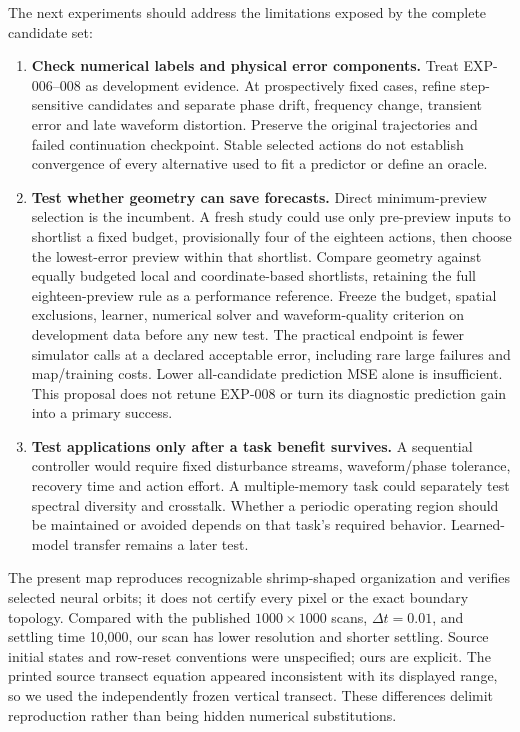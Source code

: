 \documentclass[11pt,letterpaper]{article}
\begin{document}
The next experiments should address the limitations exposed by the complete candidate set:
\begin{enumerate}
\item \textbf{Check numerical labels and physical error components.} Treat EXP-006--008 as development evidence. At prospectively fixed cases, refine step-sensitive candidates and separate phase drift, frequency change, transient error and late waveform distortion. Preserve the original trajectories and failed continuation checkpoint. Stable selected actions do not establish convergence of every alternative used to fit a predictor or define an oracle.
\item \textbf{Test whether geometry can save forecasts.} Direct minimum-preview selection is the incumbent. A fresh study could use only pre-preview inputs to shortlist a fixed budget, provisionally four of the eighteen actions, then choose the lowest-error preview within that shortlist. Compare geometry against equally budgeted local and coordinate-based shortlists, retaining the full eighteen-preview rule as a performance reference. Freeze the budget, spatial exclusions, learner, numerical solver and waveform-quality criterion on development data before any new test. The practical endpoint is fewer simulator calls at a declared acceptable error, including rare large failures and map/training costs. Lower all-candidate prediction MSE alone is insufficient. This proposal does not retune EXP-008 or turn its diagnostic prediction gain into a primary success.
\item \textbf{Test applications only after a task benefit survives.} A sequential controller would require fixed disturbance streams, waveform/phase tolerance, recovery time and action effort. A multiple-memory task could separately test spectral diversity and crosstalk. Whether a periodic operating region should be maintained or avoided depends on that task's required behavior. Learned-model transfer remains a later test.
\end{enumerate}

The present map reproduces recognizable shrimp-shaped organization and verifies selected neural orbits; it does not certify every pixel or the exact boundary topology. Compared with the published $1000\times1000$ scans, $\Delta t=0.01$, and settling time 10,000, our scan has lower resolution and shorter settling. Source initial states and row-reset conventions were unspecified; ours are explicit. The printed source transect equation appeared inconsistent with its displayed range, so we used the independently frozen vertical transect. These differences delimit reproduction rather than being hidden numerical substitutions.
\end{document}
